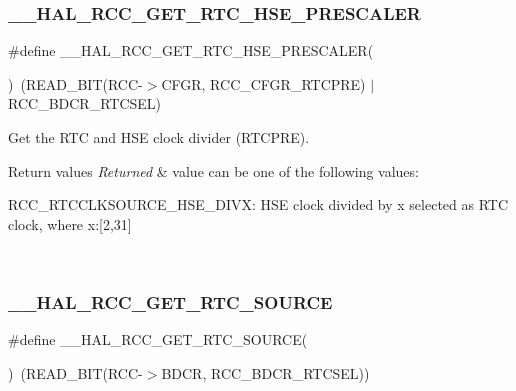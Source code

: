 \subsubsection{\texorpdfstring{\+\_\+\+\_\+\+H\+A\+L\+\_\+\+R\+C\+C\+\_\+\+G\+E\+T\+\_\+\+R\+T\+C\+\_\+\+H\+S\+E\+\_\+\+P\+R\+E\+S\+C\+A\+L\+ER}{\_\_HAL\_RCC\_GET\_RTC\_HSE\_PRESCALER}}
{\footnotesize\ttfamily \#define \+\_\+\+\_\+\+H\+A\+L\+\_\+\+R\+C\+C\+\_\+\+G\+E\+T\+\_\+\+R\+T\+C\+\_\+\+H\+S\+E\+\_\+\+P\+R\+E\+S\+C\+A\+L\+ER(\begin{DoxyParamCaption}{ }\end{DoxyParamCaption})~(R\+E\+A\+D\+\_\+\+B\+IT(R\+CC-\/$>$C\+F\+GR, R\+C\+C\+\_\+\+C\+F\+G\+R\+\_\+\+R\+T\+C\+P\+RE) $\vert$ R\+C\+C\+\_\+\+B\+D\+C\+R\+\_\+\+R\+T\+C\+S\+EL)}



Get the R\+TC and H\+SE clock divider (R\+T\+C\+P\+RE). 


\begin{DoxyRetVals}{Return values}
{\em Returned} & value can be one of the following values\+: \begin{DoxyItemize}
\item R\+C\+C\+\_\+\+R\+T\+C\+C\+L\+K\+S\+O\+U\+R\+C\+E\+\_\+\+H\+S\+E\+\_\+\+D\+I\+V\+X\+: H\+SE clock divided by x selected as R\+TC clock, where x\+:\mbox{[}2,31\mbox{]} \end{DoxyItemize}
\\
\hline
\end{DoxyRetVals}
\mbox{\label{group___r_c_c___internal___r_t_c___clock___configuration_gad40d00ff1c984ebd011ea9f6e7f93c44}} 
\subsubsection{\texorpdfstring{\+\_\+\+\_\+\+H\+A\+L\+\_\+\+R\+C\+C\+\_\+\+G\+E\+T\+\_\+\+R\+T\+C\+\_\+\+S\+O\+U\+R\+CE}{\_\_HAL\_RCC\_GET\_RTC\_SOURCE}}
{\footnotesize\ttfamily \#define \+\_\+\+\_\+\+H\+A\+L\+\_\+\+R\+C\+C\+\_\+\+G\+E\+T\+\_\+\+R\+T\+C\+\_\+\+S\+O\+U\+R\+CE(\begin{DoxyParamCaption}{ }\end{DoxyParamCaption})~(R\+E\+A\+D\+\_\+\+B\+IT(R\+CC-\/$>$B\+D\+CR, R\+C\+C\+\_\+\+B\+D\+C\+R\+\_\+\+R\+T\+C\+S\+EL))}



